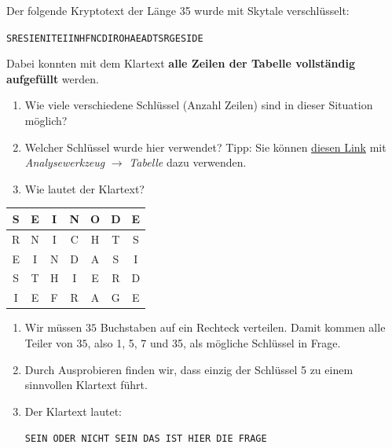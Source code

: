 \begin{myexercise}
	Der folgende Kryptotext der Länge 35 wurde mit Skytale verschlüsselt:
	\begin{center}
		\texttt{SRESIENITEIINHFNCDIROHAEADTSRGESIDE}
	\end{center}
	Dabei konnten mit dem Klartext \textbf{alle Zeilen der Tabelle vollständig aufgefüllt} werden.
	\begin{enumerate}
		\item Wie viele verschiedene Schlüssel (Anzahl Zeilen) sind in dieser Situation möglich?
		\item Welcher Schlüssel wurde hier verwendet? Tipp: Sie können \href{https://cryptbreaker.marcwidmer.xyz/solve}{diesen Link} mit \emph{Analysewerkzeug} $\rightarrow$ \emph{Tabelle} dazu verwenden.
		\item Wie lautet der Klartext?
	\end{enumerate}

	\begin{myanswer}
		\begin{table}[H]
			\centering
			\begin{tabular}{*{6}{C|}C}
				S & E & I & N & O & D & E \\ \hline
				R & N & I & C & H & T & S \\ \hline
				E & I & N & D & A & S & I \\ \hline
				S & T & H & I & E & R & D \\ \hline
				I & E & F & R & A & G & E
			\end{tabular}
		\end{table}
		\begin{enumerate}
			\item Wir müssen $35$ Buchstaben auf ein Rechteck verteilen. Damit kommen alle Teiler von $35$, also 1, 5, 7 und 35, als mögliche Schlüssel in Frage.
			\item Durch Ausprobieren finden wir, dass einzig der Schlüssel 5 zu einem sinnvollen Klartext führt.
			\item Der Klartext lautet:
			      \begin{center}
				      {\small
					      \texttt{SEIN ODER NICHT SEIN DAS IST HIER DIE FRAGE}}
			      \end{center}
		\end{enumerate}
	\end{myanswer}
\end{myexercise}

